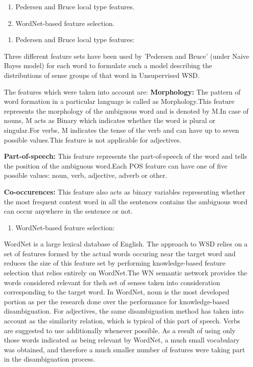 \begin{enumerate}
	\item Pedersen and Bruce local type features.
	\item WordNet-based feature selection.
\end{enumerate}

\begin{enumerate}
	\item Pedersen and Bruce local type features:
\end{enumerate}
Three different feature sets have been used by 'Pedersen and Bruce' (under Naive Bayes model) for each word to formulate such a model describing the distributions of sense groups of that word in Unsupervised WSD.

The features which were taken into account are:
\textbf{Morphology:} The pattern of word formation in a particular language is called as Morphology.This feature represents the morphology of the ambiguous word and is denoted by M.In case of nouns, M acts as Binary which indicates whether the word is plural or singular.For verbs, M indicates the tense of the verb and can have up to seven possible values.This feature is not applicable for adjectives.

\textbf{Part-of-speech:} This feature represents the part-of-speech of the word and tells the position of the ambiguous word.Each POS feature can have one of five possible values: noun, verb, adjective, adverb or other.

\textbf{Co-occurences:} This feature also acts as binary variables representing whether the most frequent content word in all the sentences contains the ambiguous word can occur anywhere in the sentence or not.

\begin{enumerate}
	\item WordNet-based feature selection:
\end{enumerate}
WordNet is a large lexical database of English. The approach to WSD relies on a set of features formed by the actual words occuring near the target word and reduces the size of this feature set by performing knowledge-based feature selection that relies entirely on WordNet.The WN semantic network provides the words considered relevant for theh set of senses taken into consideration corresponding to the target word.
In WordNet, noun is the most developed portion as per the research done over the performance for knowledge-based disambiguation.
For adjectives, the same disambiguation method has taken into account as the similarity relation, which  is typical of this part of speech.
Verbs are suggested to use additionally whenever possible.
As a result of using only those words indicated as being relevant by WordNet, a much small vocabulary was obtained, and therefore a much smaller number of features were taking part in the disambiguation process.

